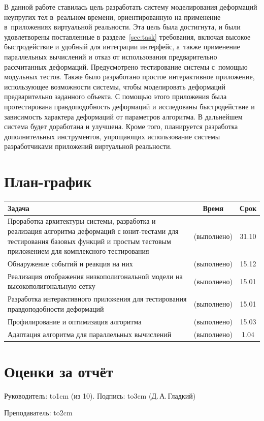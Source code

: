 \documentclass[a4paper, 14pt, titlepage]{extarticle}
\newcommand{\underscore}[1]{\hbox to#1{\hrulefill}}
\let\oldsection\section
\renewcommand{\section}{\newpage\oldsection}
\begin{document}
    В данной работе ставилась цель разработать систему моделирования деформаций неупругих тел
    в~реальном времени, ориентированную на применение в~приложениях виртуальной реальности. Эта цель
    была достигнута, и были удовлетворены поставленные в разделе~\ref{sec:task} требования, включая
    высокое быстродействие и удобный для интеграции интерфейс, а~также применение параллельных
    вычислений и отказ от использования предварительно рассчитанных деформаций. Предусмотрено
    тестирование системы с~помощью модульных тестов. Также было разработано простое интерактивное
    приложение, использующее возможности системы, чтобы моделировать деформаций предварительно
    заданного объекта. С помощью этого приложения была протестирована правдоподобность деформаций и
    исследованы быстродействие и зависимость характера деформаций от параметров алгоритма. В
    дальнейшем система будет доработана и улучшена. Кроме того, планируется разработка
    дополнительных инструментов, упрощающих использование системы разработчиками приложений
    виртуальной реальности.

  \section{План-график}

    \begin{center}
      \begin{tabular}{|p{10.3cm}|c|c|}\hline
        Задача                                       & Время         & Срок  \\\hline\hline
        Проработка архитектуры системы, разработка и реализация алгоритма деформаций
        с юнит-тестами для тестирования базовых функций и простым тестовым приложением
        для комплексного тестирования                & (выполнено)   & 31.10 \\\hline
        Обнаружение событий и реакция на них         & (выполнено)   & 15.12 \\\hline
        Реализация отображения низкополигональной
        модели на высокополигональную сетку          & (выполнено)   & 15.01 \\\hline
        Разработка интерактивного приложения для
        тестирования правдоподобности деформаций     & (выполнено)   & 15.01 \\\hline
        Профилирование и оптимизация алгоритма       & (выполнено)   & 15.03 \\\hline
        Адаптация алгоритма для параллельных
        вычислений                                   & (выполнено)   & 1.04 \\\hline
      \end{tabular}
    \end{center}

  \section{Оценки за отчёт}

    Руководитель: \underscore{1cm} (из 10). Подпись: \underscore{3cm} (Д.\,А.\,Гладкий)

    \vspace{0.5cm}
    Преподаватель: \underscore{2cm}

  \begin{flushleft}
    
  \end{flushleft}
\end{document}

